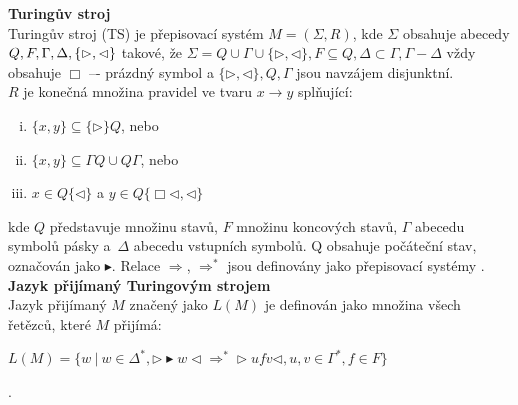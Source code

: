 \textbf{Turingův stroj} \\

Turingův stroj (TS) je přepisovací systém $M = (\Sigma, R)$, kde $\Sigma$ obsahuje abecedy $Q, F, \Gamma, \Delta, \\ \{\rhd, \lhd\}$ takové, že 
$\Sigma = Q \cup \Gamma \cup \{\rhd, \lhd\}, F \subseteq Q, \Delta \subset \Gamma, \Gamma - \Delta$ vždy obsahuje 
$\Box$ –- prázdný symbol a $\{\rhd, \lhd\}, Q, \Gamma$ jsou navzájem disjunktní.\\
$R$ je konečná množina pravidel ve tvaru $x \rightarrow y$ splňující:
\begin{enumerate}[i.]
\item $\{x, y\} \subseteq \{\rhd\}Q$, nebo
\item $\{x, y\} \subseteq \Gamma Q \cup Q\Gamma$, nebo
\item $x \in Q\{\lhd\}$ a $y \in Q\{\Box\lhd, \lhd\}$
\end{enumerate}
kde $Q$ představuje množinu stavů, $F$ množinu koncových stavů, $\Gamma$ abecedu symbolů pásky a~$\Delta$ abecedu vstupních symbolů. 
Q obsahuje počáteční stav, označován jako $\blacktriangleright$. Relace $\Rightarrow$, $\Rightarrow^*$ jsou definovány jako přepisovací systémy 
\cite[str. 199]{Meduna2014}. \\

\textbf{Jazyk přijímaný Turingovým strojem} \\
Jazyk přijímaný $M$ značený jako $L(M)$ je definován jako množina všech řetězců, které $M$ přijímá:
\begin{center}
$L(M) = \{w \ | \ w \in \Delta^*, \rhd \blacktriangleright w \lhd \Rightarrow^* \rhd ufv \lhd, u,v \in \Gamma^*, f \in F\}$ 
\end{center}
\cite[str. 200]{Meduna2014}. \\

